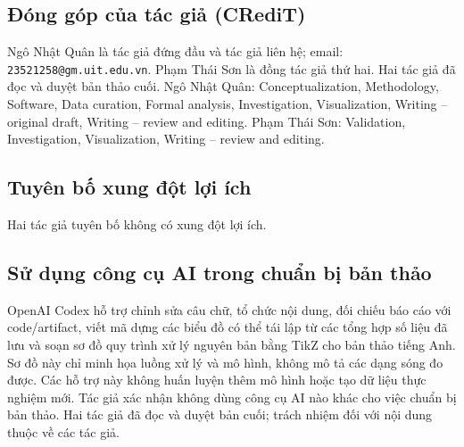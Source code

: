 \documentclass[10pt,a4paper]{article}
\begin{document}
\subsection*{Đóng góp của tác giả (CRediT)}

Ngô Nhật Quân là tác giả đứng đầu và tác giả liên hệ; email: \texttt{23521258@gm.uit.edu.vn}. Phạm Thái Sơn là đồng tác giả thứ hai. Hai tác giả đã đọc và duyệt bản thảo cuối. Ngô Nhật Quân: Conceptualization, Methodology, Software, Data curation, Formal analysis, Investigation, Visualization, Writing -- original draft, Writing -- review and editing. Phạm Thái Sơn: Validation, Investigation, Visualization, Writing -- review and editing.

\subsection*{Tuyên bố xung đột lợi ích}

Hai tác giả tuyên bố không có xung đột lợi ích.

\subsection*{Sử dụng công cụ AI trong chuẩn bị bản thảo}

OpenAI Codex hỗ trợ chỉnh sửa câu chữ, tổ chức nội dung, đối chiếu báo cáo với code/artifact, viết mã dựng các biểu đồ có thể tái lập từ các tổng hợp số liệu đã lưu và soạn sơ đồ quy trình xử lý nguyên bản bằng TikZ cho bản thảo tiếng Anh. Sơ đồ này chỉ minh họa luồng xử lý và mô hình, không mô tả các dạng sóng đo được. Các hỗ trợ này không huấn luyện thêm mô hình hoặc tạo dữ liệu thực nghiệm mới. Tác giả xác nhận không dùng công cụ AI nào khác cho việc chuẩn bị bản thảo. Hai tác giả đã đọc và duyệt bản cuối; trách nhiệm đối với nội dung thuộc về các tác giả.

\renewcommand{\refname}{Tài liệu tham khảo}
\begingroup
\scriptsize


\endgroup
\end{document}
